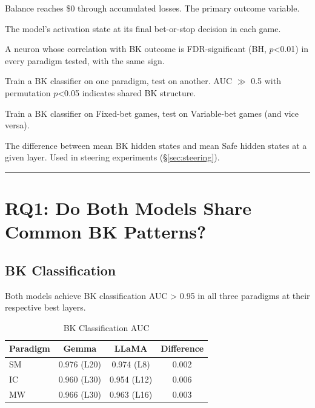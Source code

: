 \documentclass[11pt,a4paper]{article}
\begin{document}
\begin{description}[style=nextline, leftmargin=2em]
    \item[Bankruptcy (BK)] Balance reaches \$0 through accumulated losses. The primary outcome variable.
    \item[Decision Point (DP)] The model's activation state at its final bet-or-stop decision in each game.
    \item[Universal BK neuron] A neuron whose correlation with BK outcome is FDR-significant (BH, $p$<0.01) in every paradigm tested, with the same sign.
    \item[Cross-domain transfer] Train a BK classifier on one paradigm, test on another. AUC $\gg$ 0.5 with permutation $p$<0.05 indicates shared BK structure.
    \item[Cross-bet-type transfer (F1)] Train a BK classifier on Fixed-bet games, test on Variable-bet games (and vice versa).
    \item[BK direction vector] The difference between mean BK hidden states and mean Safe hidden states at a given layer. Used in steering experiments (\S\ref{sec:steering}).
\end{description}

\bigskip\hrule\bigskip

\section{RQ1: Do Both Models Share Common BK Patterns?}

\subsection{BK Classification}\label{sec:rq1_classification}

Both models achieve BK classification AUC > 0.95 in all three paradigms at their respective best layers.

\begin{table}[H]
\centering
\caption{BK Classification AUC}
\begin{tabular}{lccc}
\toprule
\textbf{Paradigm} & \textbf{Gemma} & \textbf{LLaMA} & \textbf{Difference} \\
\midrule
SM & 0.976 (L20) & 0.974 (L8) & 0.002 \\
IC & 0.960 (L30) & 0.954 (L12) & 0.006 \\
MW & 0.966 (L30) & 0.963 (L16) & 0.003 \\
\bottomrule
\end{tabular}
\end{table}
\end{document}
